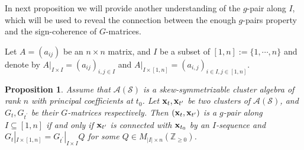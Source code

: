 \documentclass[14pt]{amsart}
\newtheorem{Proposition}[Theorem]{Proposition}
\begin{document}
 In next proposition  we will provide another understanding of the $g$-pair along $I$, which will be used to reveal the connection between the enough $g$-pairs property and the sign-coherence of $G$-matrices.


Let $A=(a_{ij})$ be an $n\times n$ matrix, and $I$ be a subset of $[1,n]:=\{1,\cdots,n\}$ and denote by $A|_{I\times I}=(a_{ij})_{i,j\in I}$ and $A|_{I\times [1,n]}=(a_{i,j})_{i\in I,j\in [1,n]}$.
\begin{Proposition}\label{prodef}
Assume that $\mathcal A(\mathcal S)$ is a skew-symmetrizable cluster algebra of rank $n$ with principal coefficients at $t_0$. Let  ${\bf x}_t,{\bf x}_{t^\prime}$ be two clusters of $\mathcal A(\mathcal S)$, and $G_t, G_{t^\prime}$
 be their $G$-matrices respectively.
  Then  $({\bf x}_t,{\bf x}_{t^\prime})$ is a $g$-pair along $I\subseteq [1,n]$ if and only if
 ${\bf x}_{t^\prime}$ is connected with ${\bf x}_{t_0}$ by an $I$-sequence and
 $G_t|_{I\times [1,n]}=G_{t^\prime}|_{I\times I}Q$ for some $Q\in M_{|I|\times n}(\mathbb Z_{\geq 0})$.
\end{Proposition}
\end{document}
